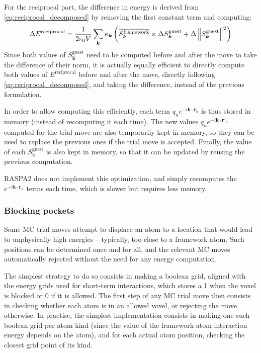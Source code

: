 \documentclass[main.tex]{subfiles}
\begin{document}
For the reciprocal part, the difference in energy is derived from \cref{eq:reciprocal_decomposed} by removing the first constant term and computing:
\[\Delta E^\text{reciprocal} = \frac1{2\varepsilon_0V} \sum_{\boldsymbol k}\kappa_{\boldsymbol k} \left(
\overline{S_{\boldsymbol k}^\text{framework}}\times\Delta S_{\boldsymbol k}^\text{guest} +
\Delta \left\|S_{\boldsymbol k}^\text{guest}\right\|^2
\right)\label{eq:reciprocal_move}\]
Since both values of $S_{\boldsymbol k}^\text{guest}$ need to be computed before and after the move to take the difference of their norm, it is actually equally efficient to directly compute both values of $E^\text{reciprocal}$ before and after the move, directly following \cref{eq:reciprocal_decomposed}, and taking the difference, instead of the previous formulation.

In order to allow computing this efficiently, each term $q_ne^{-i\boldsymbol k\cdot\boldsymbol r_n}$ is thus stored in memory (instead of recomputing it each time). The new values $q_ne^{-i\boldsymbol k\cdot\boldsymbol{r}'_n}$ computed for the trial move are also temporarily kept in memory, so they can be used to replace the previous ones if the trial move is accepted. Finally, the value of each $S_{\boldsymbol{k}}^\text{guest}$ is also kept in memory, so that it can be updated by reusing the previous computation.

RASPA2 does not implement this optimization, and simply recomputes the $e^{-i\boldsymbol k\cdot\boldsymbol r_n}$ terms each time, which is slower but requires less memory.

\subsubsection{Blocking pockets}
\label{blockingpockets}

Some MC trial moves attempt to displace an atom to a location that would lead to unphysically high energies -- typically, too close to a framework atom. Such positions can be determined once and for all, and the relevant MC moves automatically rejected without the need for any energy computation.

The simplest strategy to do so consists in making a boolean grid, aligned with the energy grids used for short-term interactions, which stores a 1 when the voxel is blocked or 0 if it is allowed. The first step of any MC trial move then consists in checking whether each atom is in an allowed voxel, or rejecting the move otherwise. In practise, the simplest implementation consists in making one such boolean grid per atom kind (since the value of the framework-atom interaction energy depends on the atom), and for each actual atom position, checking the closest grid point of its kind.
\end{document}

